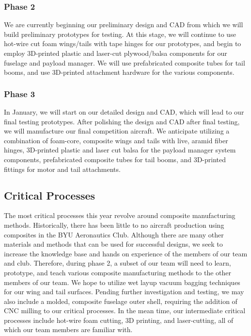 \subsubsection{Phase 2} We are currently beginning our preliminary design and CAD from which we will build preliminary prototypes for testing. At this stage, we will continue to use hot-wire cut foam wings/tails with tape hinges for our prototypes, and begin to employ 3D-printed plastic and laser-cut plywood/balsa components for our fuselage and payload manager.  We will use prefabricated composite tubes for tail booms, and use 3D-printed attachment hardware for the various components.

\subsubsection{Phase 3} In January, we will start on our detailed design and CAD, which will lead to our final testing prototypes.  After polishing the design and CAD after final testing, we will manufacture our final competition aircraft. We anticipate utilizing a combination of foam-core, composite wings and tails with live, aramid fiber hinges, 3D-printed plastic and laser cut balsa for the payload manager system components, prefabricated composite tubes for tail booms, and 3D-printed fittings for motor and tail attachments.



\subsection{Critical Processes}
\label{ssec:CriticalProcesses}

The most critical processes this year revolve around composite manufacturing methods.  Historically, there has been little to no aircraft production using composites in the BYU Aeronautics Club.  Although there are many other materials and methods that can be used for successful designs, we seek to increase the knowledge base and hands on experience of the members of our team and club.  Therefore, during phase 2, a subset of our team will need to learn, prototype, and teach various composite manufacturing methods to the other members of our team.  We hope to utilize wet layup vacuum bagging techniques for our wing and tail surfaces.  Pending further investigation and testing, we may also include a molded, composite fuselage outer shell, requiring the addition of CNC milling to our critical processes.  In the mean time, our intermediate critical processes include hot-wire foam cutting, 3D printing, and laser-cutting, all of which our team members are familiar with.
